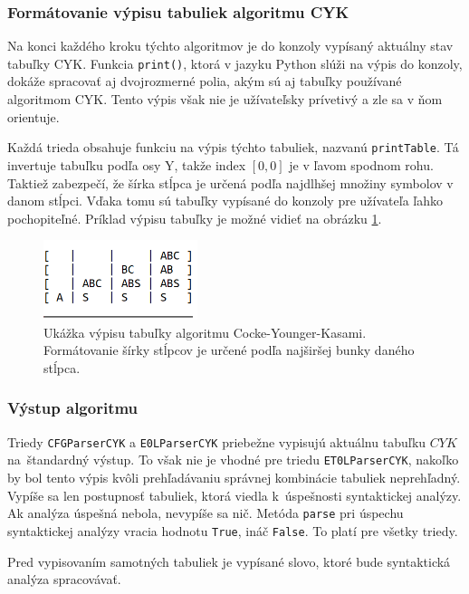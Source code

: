 \subsubsection*{Formátovanie výpisu tabuliek algoritmu CYK}
Na konci každého kroku týchto algoritmov je do konzoly vypísaný aktuálny stav tabuľky CYK. Funkcia \texttt{print()}, ktorá v jazyku Python slúži na výpis do konzoly, dokáže spracovať aj dvojrozmerné polia, akým sú aj tabuľky používané algoritmom CYK. Tento výpis však nie je užívateľsky prívetivý a zle sa v ňom orientuje.

Každá trieda obsahuje funkciu na výpis týchto tabuliek, nazvanú \texttt{printTable}. Tá invertuje tabuľku podľa osy Y, takže index $[0, 0]$ je v ľavom spodnom rohu. Taktiež zabezpečí, že šírka stĺpca je určená podľa najdlhšej množiny symbolov v danom stĺpci. Vďaka tomu sú tabuľky vypísané do konzoly pre užívateľa ľahko pochopiteľné. Príklad výpisu tabuľky je možné vidieť na obrázku \ref{tableExample}.

\begin{figure}[hbt]
	\centering
	\includegraphics[width=0.4\textwidth]{obrazky-figures/exampleTable.png}
	\caption{Ukážka výpisu tabuľky algoritmu Cocke-Younger-Kasami. Formátovanie šírky stĺpcov je určené podľa najširšej bunky daného stĺpca.}
	\label{tableExample}
\end{figure}

\subsubsection*{Výstup algoritmu}
Triedy \texttt{CFGParserCYK} a \texttt{E0LParserCYK} priebežne vypisujú aktuálnu tabuľku $CYK$ na~štandardný výstup. To však nie je vhodné pre triedu \texttt{ET0LParserCYK}, nakoľko by bol tento výpis kvôli prehľadávaniu správnej kombinácie tabuliek neprehľadný. Vypíše sa len postupnosť tabuliek, ktorá viedla k~úspešnosti syntaktickej analýzy. Ak analýza úspešná nebola, nevypíše sa nič. Metóda \texttt{parse} pri úspechu syntaktickej analýzy vracia hodnotu \texttt{True}, ináč \texttt{False}. To platí pre všetky triedy.

Pred vypisovaním samotných tabuliek je vypísané slovo, ktoré bude syntaktická analýza spracovávať.

